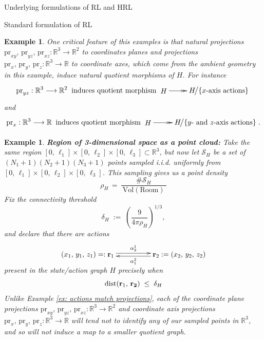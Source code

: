 \documentclass[11pt]{article}
\newtheorem{example}[subsubsection]{Example}
\begin{document}
\begin{section}{Underlying formulations of RL and HRL}
\begin{subsection}{Standard formulation of RL}
\begin{example}
One critical feature of this examples is that natural projections $\text{pr}_{xy},\,\text{pr}_{yz},\,\text{pr}_{xz}:\mathbb{R}^{3}\longrightarrow\mathbb{R}^{2}$ to coordinates planes and projections $\text{pr}_{x},\,\text{pr}_{y},\,\text{pr}_{z}:\mathbb{R}^{3}\longrightarrow\mathbb{R}$ to coordinate axes, which come from the ambient geometry in this example, induce natural quotient morphisms of $H$. For instance
$$
\text{pr}_{yz}:\mathbb{R}^{3}\longrightarrow\mathbb{R}^2
\;\;\text{induces quotient morphism}\;
\begin{xy}
(0,0)*+{H}="1";
(27,0)*+{H\!\big/\{x\text{-axis actions}\}}="2";
{\ar@{->>} "1"; "2"};
\end{xy}
$$
and
$$
\text{pr}_{x}:\mathbb{R}^{3}\longrightarrow\mathbb{R}
\;\;\text{induces quotient morphism}\;
\begin{xy}
(0,0)*+{H}="1";
(33,0)*+{H\!\big/\{y\text{- and }z\text{-axis actions}\}}="2";
{\ar@{->>} "1"; "2"};
\end{xy}.
$$
\end{example}


\begin{example}\label{ex: point cloud}
{\bf Region of 3-dimensional space as a point cloud:}
\normalfont
Take the same region $[0,\,\ell_1]\times[0,\,\ell_2]\times[0,\,\ell_3]\subset\mathbb{R}^{3}$, but now let $\mathcal{S}_{H}$ be a set of $(N_{1}+1)(N_{2}+1)(N_{3}+1)$ points sampled i.i.d. uniformly from $[0,\,\ell_1]\times[0,\,\ell_2]\times[0,\,\ell_3]$. This sampling gives us a {\em point density}
$$
\rho_{H}\,=\,\frac{\#\mathcal{S}_{H}}{\ \text{Vol}(\text{Room})\ }
$$
Fix the {\em connectivity threshold}
$$
\delta_{H}
\;:=\;
\left(
\frac{9}{4\pi\rho_{H}}
\right)^{\!1/3},
$$
and declare that there are actions
$$
\begin{xy}
(0,0)*+{(x_{1},\,y_{1},\,z_{1})=:\bold{r}_{1}}="1";
(45,0)*+{\bold{r}_{2}:=(x_{2},\,y_{2},\,z_{2})}="2";
{\ar@<2pt>^{\alpha^{1}_{2}} "1"; "2"}
{\ar@<2pt>^{\alpha^{2}_{1}} "2"; "1"}
\end{xy}
$$
present in the state/action graph $H$ precisely when
$$
\text{dist}(\bold{r}_{1},\,\bold{r_{2}})
\;\le\;\delta_{H}
$$
Unlike Example \ref{ex: actions match projections},  each of the coordinate plane projections $\text{pr}_{xy},\,\text{pr}_{yz},\,\text{pr}_{xz}:\mathbb{R}^{3}\longrightarrow\mathbb{R}^{2}$ and coordinate axis projections $\text{pr}_{x},\,\text{pr}_{y},\,\text{pr}_{z}:\mathbb{R}^{3}\longrightarrow\mathbb{R}$ will tend not to identify any of our sampled points in $\mathbb{R}^{3}$, and so will not induce a map to a smaller quotient graph.
\end{example}


\end{subsection}
\end{section}
\end{document}
